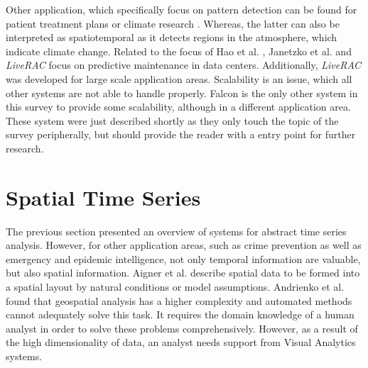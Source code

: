 \documentclass[electronic]{vgtc}             %
\begin{document}
Other application, which specifically focus on pattern detection can be found for patient treatment plans \cite{Gschwandtner:2011} or climate research \cite{Kehrer:2008}.
Whereas, the latter can also be interpreted as spatiotemporal as it detects regions in the atmosphere, which indicate climate change.
Related to the focus of Hao et al. \cite{Hao:2009, Hao:2011}, Janetzko et al. \cite{janetzko:2014} and \textit{LiveRAC} \cite{McLachlan:2008} focus on predictive maintenance in data centers.
Additionally, \textit{LiveRAC} was developed for large scale application areas. 
Scalability is an issue, which all other systems are not able to handle properly.
Falcon \cite{steed:2017} is the only other system in this survey to provide some scalability, although in a different application area. 
These system were just described shortly as they only touch the topic of the survey peripherally, but should provide the reader with a entry point for further research.


\section{Spatial Time Series\label{sec:spatiotemp}}
The previous section presented an overview of systems for abstract time series analysis. 
However, for other application areas, such as crime prevention as well as emergency and epidemic intelligence, not only temporal information are valuable, but also spatial information.
Aigner et al. \cite{Aigner:2007} describe spatial data to be formed into a spatial layout by natural conditions or model assumptions.
Andrienko et al. \cite{Andrienko:2008, Andrienko:2010:Space} found that geospatial analysis has a higher complexity and automated methods cannot adequately solve this task. 
It requires the domain knowledge of a human analyst in order to solve these problems comprehensively.
However, as a result of the high dimensionality of data, an analyst needs support from Visual Analytics systems.
\end{document}
